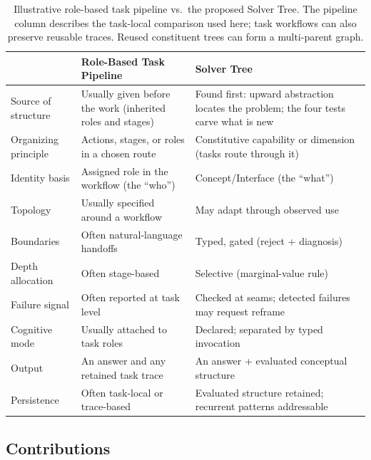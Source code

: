\documentclass[11pt]{article}
\begin{document}
\begin{table}[H]
\centering
\small
\caption{Illustrative role-based task pipeline vs.\ the proposed Solver Tree. The pipeline column describes the task-local comparison used here; task workflows can also preserve reusable traces. Reused constituent trees can form a multi-parent graph.}
\begin{tabular}{@{}lp{5cm}p{5.5cm}@{}}
\toprule
& \textbf{Role-Based Task Pipeline} & \textbf{Solver Tree} \\
\midrule
Source of structure & Usually given before the work (inherited roles and stages) & Found first: upward abstraction locates the problem; the four tests carve what is new \\
Organizing principle & Actions, stages, or roles in a chosen route & Constitutive capability or dimension (tasks route through it) \\
Identity basis & Assigned role in the workflow (the ``who'') & Concept/Interface (the ``what'') \\
Topology & Usually specified around a workflow & May adapt through observed use \\
Boundaries & Often natural-language handoffs & Typed, gated (reject + diagnosis) \\
Depth allocation & Often stage-based & Selective (marginal-value rule) \\
Failure signal & Often reported at task level & Checked at seams; detected failures may request reframe \\
Cognitive mode & Usually attached to task roles & Declared; separated by typed invocation \\
Output & An answer and any retained task trace & An answer + evaluated conceptual structure \\
Persistence & Often task-local or trace-based & Evaluated structure retained; recurrent patterns addressable \\
\bottomrule
\end{tabular}
\label{tab:pipeline-vs-solver}
\end{table}

\subsection{Contributions}
\label{sec:contributions}
\end{document}

